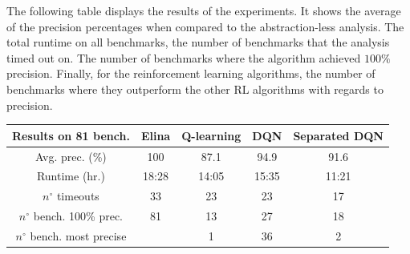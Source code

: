 The following table displays the results of the experiments. It shows the average of the precision percentages when compared to the abstraction-less analysis. The total runtime on all benchmarks, the number of benchmarks that the analysis timed out on. The number of benchmarks where the algorithm achieved $100\%$ precision. Finally, for the reinforcement learning algorithms, the number of benchmarks where they outperform the other RL algorithms with regards to precision. 

\begin{center}  
\begin{tabular}{||c c c c c||}
 
 \hline
 Results on 81 bench. & Elina & Q-learning & DQN & Separated DQN \\ [0.5ex] 
 \hline\hline
 Avg. prec. (\%) & 100 & 87.1 & 94.9 & 91.6\\
 Runtime (hr.) & 18:28 & 14:05 & 15:35 & 11:21\\
 $n^{\circ}$ timeouts & 33 & 23 & 23 & 17\\
 $n^{\circ}$ bench. 100\% prec. & 81 & 13 & 27 & 18\\
 $n^{\circ}$ bench. most precise &  & 1 & 36 & 2\\
 
 \hline
\end{tabular}
\end{center}

